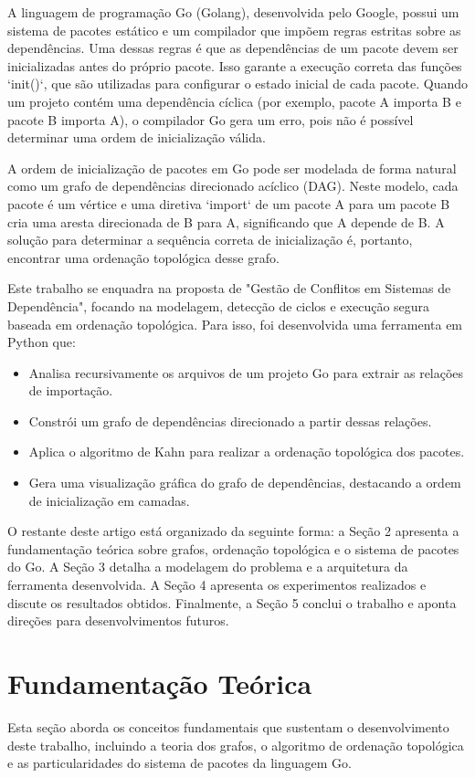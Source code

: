 \documentclass[12pt]{article}
\begin{document}
A linguagem de programação Go (Golang), desenvolvida pelo Google, possui um sistema de pacotes estático e um compilador que impõem regras estritas sobre as dependências. Uma dessas regras é que as dependências de um pacote devem ser inicializadas antes do próprio pacote. Isso garante a execução correta das funções `init()`, que são utilizadas para configurar o estado inicial de cada pacote. Quando um projeto contém uma dependência cíclica (por exemplo, pacote A importa B e pacote B importa A), o compilador Go gera um erro, pois não é possível determinar uma ordem de inicialização válida.

A ordem de inicialização de pacotes em Go pode ser modelada de forma natural como um grafo de dependências direcionado acíclico (DAG). Neste modelo, cada pacote é um vértice e uma diretiva `import` de um pacote A para um pacote B cria uma aresta direcionada de B para A, significando que A depende de B. A solução para determinar a sequência correta de inicialização é, portanto, encontrar uma ordenação topológica desse grafo.

Este trabalho se enquadra na proposta de "Gestão de Conflitos em Sistemas de Dependência", focando na modelagem, detecção de ciclos e execução segura baseada em ordenação topológica. Para isso, foi desenvolvida uma ferramenta em Python que:
\begin{itemize}
    \item Analisa recursivamente os arquivos de um projeto Go para extrair as relações de importação.
    \item Constrói um grafo de dependências direcionado a partir dessas relações.
    \item Aplica o algoritmo de Kahn para realizar a ordenação topológica dos pacotes.
    \item Gera uma visualização gráfica do grafo de dependências, destacando a ordem de inicialização em camadas.
\end{itemize}

O restante deste artigo está organizado da seguinte forma: a Seção 2 apresenta a fundamentação teórica sobre grafos, ordenação topológica e o sistema de pacotes do Go. A Seção 3 detalha a modelagem do problema e a arquitetura da ferramenta desenvolvida. A Seção 4 apresenta os experimentos realizados e discute os resultados obtidos. Finalmente, a Seção 5 conclui o trabalho e aponta direções para desenvolvimentos futuros.

\section{Fundamentação Teórica}
Esta seção aborda os conceitos fundamentais que sustentam o desenvolvimento deste trabalho, incluindo a teoria dos grafos, o algoritmo de ordenação topológica e as particularidades do sistema de pacotes da linguagem Go.
\end{document}
